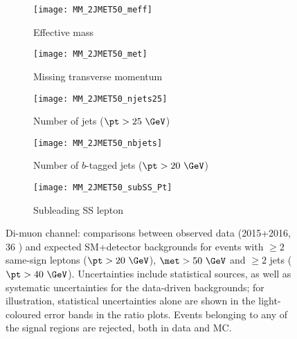 \begin{figure}[t!]
\centering
\begin{subfigure}[t]{0.48\textwidth}
\texttt{[image: MM\_2JMET50\_meff]}
\caption{Effective mass \meff}
\end{subfigure}
\begin{subfigure}[t]{0.48\textwidth}
\texttt{[image: MM\_2JMET50\_met]}
\caption{Missing transverse momentum \met}
\end{subfigure}
\begin{subfigure}[t]{0.48\textwidth}
\texttt{[image: MM\_2JMET50\_njets25]}
\caption{Number of jets ($\pt>25~\GeV$)}
\end{subfigure}
\begin{subfigure}[t]{0.48\textwidth}
\texttt{[image: MM\_2JMET50\_nbjets]}
\caption{Number of $b$-tagged jets ($\pt>20~\GeV$)}
\end{subfigure}
\begin{subfigure}[t]{0.48\textwidth}
\texttt{[image: MM\_2JMET50\_subSS\_Pt]}
\caption{Subleading SS lepton \pt}
\end{subfigure}
\caption{Di-muon channel: comparisons between observed data (2015+2016, 36 \ifb) and expected SM+detector backgrounds 
for events with $\ge 2$ same-sign leptons ($\pt>20~\GeV$), $\met>50~\GeV$ and $\ge 2$ jets ($\pt>40~\GeV$). 
Uncertainties include statistical sources, as well as systematic uncertainties for the data-driven backgrounds; 
for illustration, statistical uncertainties alone are shown in the light-coloured error bands in the ratio plots. 
Events belonging to any of the signal regions are rejected, both in data and MC.  
}
\label{fig:distributions_channelMM_2015}
\end{figure} 

